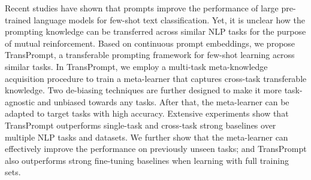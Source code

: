 Recent studies have shown that prompts improve the performance of large pre-trained language models for few-shot text classification. Yet, it is unclear how the prompting knowledge can be transferred across similar NLP tasks for the purpose of mutual reinforcement. Based on continuous prompt embeddings, we propose TransPrompt, a transferable prompting framework for few-shot learning across similar tasks. In TransPrompt, we employ a multi-task meta-knowledge acquisition procedure to train a meta-learner that captures cross-task transferable knowledge. Two de-biasing techniques are further designed to make it more task-agnostic and unbiased towards any tasks. After that, the meta-learner can be adapted to target tasks with high accuracy. Extensive experiments show that TransPrompt outperforms single-task and cross-task strong baselines over multiple NLP tasks and datasets. We further show that the meta-learner can effectively improve the performance on previously unseen tasks; and TransPrompt also outperforms strong fine-tuning baselines when learning with full training sets.

